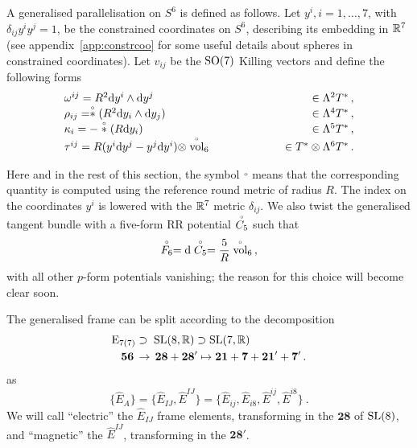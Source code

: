 \documentclass[debug]{phd}
\begin{document}
						A generalised parallelisation on $S^6$ is defined as follows. 
						Let $y^i, i = 1, \dots , 7$, with $\delta_{ij} y^i y^j = 1$, be the constrained coordinates on $S^6$, describing its embedding in $\mathbb{R}^7$ (see appendix~\ref{app:constrcoo} for some useful details about spheres in constrained coordinates). 
						Let $v_{ij}$ be the $\mathrm{SO}(7)$ Killing vectors and define the following forms
							\begin{equation}\label{deflof}
								\begin{array}{l c r}
									\omega^{ij} = R^2 \mathrm{d} y^i \wedge \mathrm{d} y^j					& \phantom{T^*\otimes \Lambda^6T^*} 	& \in \Lambda^2 T^*\, , \\
									\rho_{ij} = \stackrel{\scriptscriptstyle{\circ}}{*}(R^2 \mathrm{d} y_i \wedge \mathrm{d} y_j)				& \phantom{T^*\otimes \Lambda^6T^*} 	& \in \Lambda^4 T^*\, , \\
									\kappa_i = -\stackrel{\scriptscriptstyle{\circ}}{*}(R \mathrm{d} y_i) 							& \phantom{T^*\otimes \Lambda^6T^*} 	& \in \Lambda^5 T^*\, , \\
									\tau^{ij} = R (y^i \mathrm{d} y^j - y^j \mathrm{d} y^i)\otimes \stackrel{\scriptscriptstyle{\circ}}{\rm vol}_6 & \phantom{T^*\otimes \Lambda^6T^*} 		& \in T^*\otimes \Lambda^6T^*\, .
								\end{array}
							\end{equation}

					Here and in the rest of this section, the symbol $\stackrel{\scriptscriptstyle{\circ}}{}$ means that the corresponding quantity is computed using the reference round metric of radius $R$. 
					The index on the coordinates $y^i$ is lowered with the $\mathbb{R}^7$ metric $\delta_{ij}$.
					We also twist the generalised tangent bundle with a five-form RR potential $\stackrel{\scriptscriptstyle{\circ}}{C_5}$ such that 
							\begin{equation}\label{F6onS6}
								\stackrel{\scriptscriptstyle{\circ}}{F_6} =\mathrm{d} \stackrel{\scriptscriptstyle{\circ}}{C_5} = \frac{5}{R} \stackrel{\scriptscriptstyle{\circ}}{\rm vol}_6 \, ,
							\end{equation} 
					with all other $p$-form potentials vanishing; the reason for this choice will become clear soon.

					The generalised frame can be split according to the decomposition 
							\begin{equation}\label{decomp_E7}
								\begin{split}
									\mathrm{E}_{7(7)} &\supset\; \mathrm{SL}(8,\mathbb R) \supset \mathrm{SL}(7,\mathbb R) \\
											\mathbf{56}\, &\to\, \mathbf{28} + \mathbf{28'} \mapsto \mathbf{21} + \mathbf{7} + \mathbf{21'}+ \mathbf{7'} \, .
								\end{split}
							\end{equation}
					as
							\begin{equation}
								\{\hat{E}_A\} = \{\hat{E}_{IJ}, \hat{E}^{IJ}\} = \{\hat{E}_{ij},\hat{E}_{i8},\hat{E}^{ij},\hat{E}^{i8}\}\ .
							\end{equation}
					We will call ``electric'' the $\hat{E}_{IJ}$ frame elements, transforming in the $\mathbf{28}$ of $\mathrm{SL}(8)$, and ``magnetic'' the $\hat{E}^{IJ}$, transforming in the $\mathbf{28'}$.
\end{document}
